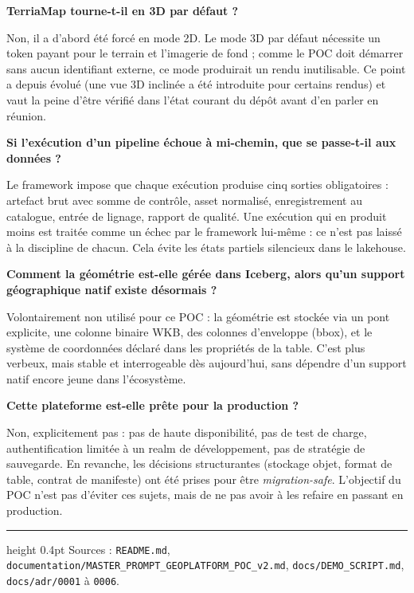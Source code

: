 \documentclass[11pt,a4paper]{article}
\newcommand{\question}[1]{\par\vspace{9pt}\headingfont\bfseries\color{navy} #1\par\vspace{2pt}\normalfont\rmfamily\color{darktext}}
\begin{document}
\question{TerriaMap tourne-t-il en 3D par défaut ?}
Non, il a d'abord été forcé en mode 2D. Le mode 3D par défaut nécessite un token payant pour le terrain et l'imagerie de fond ; comme le POC doit démarrer sans aucun identifiant externe, ce mode produirait un rendu inutilisable. Ce point a depuis évolué (une vue 3D inclinée a été introduite pour certains rendus) et vaut la peine d'être vérifié dans l'état courant du dépôt avant d'en parler en réunion.

\question{Si l'exécution d'un pipeline échoue à mi-chemin, que se passe-t-il aux données ?}
Le framework impose que chaque exécution produise cinq sorties obligatoires : artefact brut avec somme de contrôle, asset normalisé, enregistrement au catalogue, entrée de lignage, rapport de qualité. Une exécution qui en produit moins est traitée comme un échec par le framework lui-même : ce n'est pas laissé à la discipline de chacun. Cela évite les états partiels silencieux dans le lakehouse.

\question{Comment la géométrie est-elle gérée dans Iceberg, alors qu'un support géographique natif existe désormais ?}
Volontairement non utilisé pour ce POC : la géométrie est stockée via un pont explicite, une colonne binaire WKB, des colonnes d'enveloppe (bbox), et le système de coordonnées déclaré dans les propriétés de la table. C'est plus verbeux, mais stable et interrogeable dès aujourd'hui, sans dépendre d'un support natif encore jeune dans l'écosystème.

\question{Cette plateforme est-elle prête pour la production ?}
Non, explicitement pas : pas de haute disponibilité, pas de test de charge, authentification limitée à un realm de développement, pas de stratégie de sauvegarde. En revanche, les décisions structurantes (stockage objet, format de table, contrat de manifeste) ont été prises pour être \emph{migration-safe}. L'objectif du POC n'est pas d'éviter ces sujets, mais de ne pas avoir à les refaire en passant en production.

\vspace{16pt}
{\footnotesize\color{subtext}\hrule height 0.4pt\vspace{6pt}
Sources : \texttt{README.md}, \texttt{documentation/MASTER\_PROMPT\_GEOPLATFORM\_POC\_v2.md}, \texttt{docs/DEMO\_SCRIPT.md}, \texttt{docs/adr/0001} à \texttt{0006}.}
\end{document}
